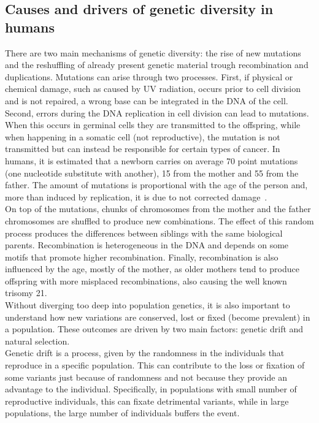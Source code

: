 \subsection{Causes and drivers of genetic diversity in humans}
There are two main mechanisms of genetic diversity: the rise of new mutations and the reshuffling of already present genetic material trough recombination and duplications. Mutations can arise through two processes. First, if physical or chemical damage, such as caused by UV radiation, occurs prior to cell division and is not repaired, a wrong base can be integrated in the DNA of the cell. Second, errors during the DNA replication in cell division can lead to mutations. When this occurs in germinal cells they are transmitted to the offspring, while when happening in a somatic cell (not reproductive), the mutation is not transmitted but can instead be responsible for certain types of cancer. In humans, it is estimated that a newborn carries on average 70 point mutations (one nucleotide substitute with another), 15 from the mother and 55 from the father. The amount of mutations is proportional with the age of the person and, more than induced by replication, it is due to not corrected damage~\cite{genome_diversity_quintana}.\\
On top of the mutations, chunks of chromosomes from the mother and the father chromosomes are shuffled to produce new combinations. The effect of this random process produces the differences between siblings with the same biological parents. Recombination is heterogeneous in the DNA and depends on some motifs that promote higher recombination. Finally, recombination is also influenced by the age, mostly of the mother, as older mothers tend to produce offspring with more misplaced recombinations, also causing the well known trisomy 21.\\
Without diverging too deep into population genetics, it is also important to understand how new variations are conserved, lost or fixed (become prevalent) in a population. These outcomes are driven by two main factors: genetic drift and natural selection.\\
Genetic drift is a process, given by the randomness in the individuals that reproduce in a specific population. This can contribute to the loss or fixation of some variants just because of randomness and not because they provide an advantage to the individual. Specifically, in populations with small number of reproductive individuals, this can fixate detrimental variants, while in large populations, the large number of individuals buffers the event. \\
